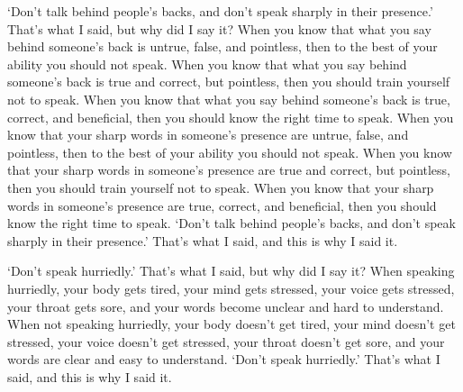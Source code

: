 \documentclass[12pt,openany]{book}%
\begin{document}
‘Don’t talk behind people’s backs, and don’t speak sharply in their presence.’ That’s what I said, but why did I say it? When you know that what you say behind someone’s back is untrue, false, and pointless, then to the best of your ability you should not speak. When you know that what you say behind someone’s back is true and correct, but pointless, then you should train yourself not to speak. When you know that what you say behind someone’s back is true, correct, and beneficial, then you should know the right time to speak. When you know that your sharp words in someone’s presence are untrue, false, and pointless, then to the best of your ability you should not speak. When you know that your sharp words in someone’s presence are true and correct, but pointless, then you should train yourself not to speak. When you know that your sharp words in someone’s presence are true, correct, and beneficial, then you should know the right time to speak. ‘Don’t talk behind people’s backs, and don’t speak sharply in their presence.’ That’s what I said, and this is why I said it. 

‘Don’t speak hurriedly.’ That’s what I said, but why did I say it? When speaking hurriedly, your body gets tired, your mind gets stressed, your voice gets stressed, your throat gets sore, and your words become unclear and hard to understand. When not speaking hurriedly, your body doesn’t get tired, your mind doesn’t get stressed, your voice doesn’t get stressed, your throat doesn’t get sore, and your words are clear and easy to understand. ‘Don’t speak hurriedly.’ That’s what I said, and this is why I said it. 
\end{document}
